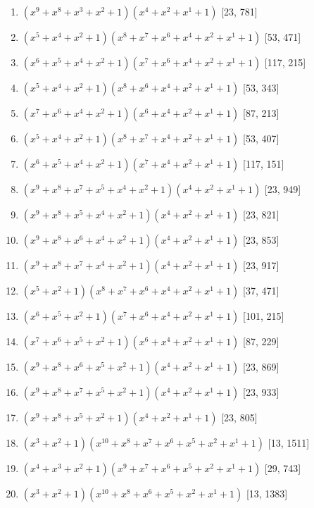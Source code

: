 \documentclass[10pt,twocolumn]{article}
\begin{document}
\begin{enumerate}
\item $(x^{9} + x^{8} + x^{3} + x^{2} + 1)(x^{4} + x^{2} + x^{1} + 1)$  [23, 781]
\item $(x^{5} + x^{4} + x^{2} + 1)(x^{8} + x^{7} + x^{6} + x^{4} + x^{2} + x^{1} + 1)$  [53, 471]
\item $(x^{6} + x^{5} + x^{4} + x^{2} + 1)(x^{7} + x^{6} + x^{4} + x^{2} + x^{1} + 1)$  [117, 215]
\item $(x^{5} + x^{4} + x^{2} + 1)(x^{8} + x^{6} + x^{4} + x^{2} + x^{1} + 1)$  [53, 343]
\item $(x^{7} + x^{6} + x^{4} + x^{2} + 1)(x^{6} + x^{4} + x^{2} + x^{1} + 1)$  [87, 213]
\item $(x^{5} + x^{4} + x^{2} + 1)(x^{8} + x^{7} + x^{4} + x^{2} + x^{1} + 1)$  [53, 407]
\item $(x^{6} + x^{5} + x^{4} + x^{2} + 1)(x^{7} + x^{4} + x^{2} + x^{1} + 1)$  [117, 151]
\item $(x^{9} + x^{8} + x^{7} + x^{5} + x^{4} + x^{2} + 1)(x^{4} + x^{2} + x^{1} + 1)$  [23, 949]
\item $(x^{9} + x^{8} + x^{5} + x^{4} + x^{2} + 1)(x^{4} + x^{2} + x^{1} + 1)$  [23, 821]
\item $(x^{9} + x^{8} + x^{6} + x^{4} + x^{2} + 1)(x^{4} + x^{2} + x^{1} + 1)$  [23, 853]
\item $(x^{9} + x^{8} + x^{7} + x^{4} + x^{2} + 1)(x^{4} + x^{2} + x^{1} + 1)$  [23, 917]
\item $(x^{5} + x^{2} + 1)(x^{8} + x^{7} + x^{6} + x^{4} + x^{2} + x^{1} + 1)$  [37, 471]
\item $(x^{6} + x^{5} + x^{2} + 1)(x^{7} + x^{6} + x^{4} + x^{2} + x^{1} + 1)$  [101, 215]
\item $(x^{7} + x^{6} + x^{5} + x^{2} + 1)(x^{6} + x^{4} + x^{2} + x^{1} + 1)$  [87, 229]
\item $(x^{9} + x^{8} + x^{6} + x^{5} + x^{2} + 1)(x^{4} + x^{2} + x^{1} + 1)$  [23, 869]
\item $(x^{9} + x^{8} + x^{7} + x^{5} + x^{2} + 1)(x^{4} + x^{2} + x^{1} + 1)$  [23, 933]
\item $(x^{9} + x^{8} + x^{5} + x^{2} + 1)(x^{4} + x^{2} + x^{1} + 1)$  [23, 805]
\item $(x^{3} + x^{2} + 1)(x^{10} + x^{8} + x^{7} + x^{6} + x^{5} + x^{2} + x^{1} + 1)$  [13, 1511]
\item $(x^{4} + x^{3} + x^{2} + 1)(x^{9} + x^{7} + x^{6} + x^{5} + x^{2} + x^{1} + 1)$  [29, 743]
\item $(x^{3} + x^{2} + 1)(x^{10} + x^{8} + x^{6} + x^{5} + x^{2} + x^{1} + 1)$  [13, 1383]

\end{enumerate}
\end{document}
